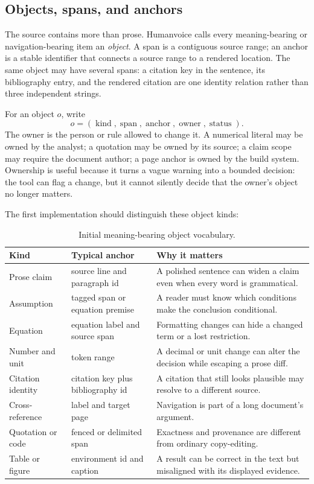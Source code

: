 \subsection{Objects, spans, and anchors}

The source contains more than prose. Humanvoice calls every meaning-bearing
or navigation-bearing item an \emph{object}. A span is a contiguous source
range; an anchor is a stable identifier that connects a source range to a
rendered location. The same object may have several spans: a citation key in
the sentence, its bibliography entry, and the rendered citation are one
identity relation rather than three independent strings.

For an object $o$, write
\[
  o=(\operatorname{kind},\operatorname{span},\operatorname{anchor},
     \operatorname{owner},\operatorname{status}).
\]
The owner is the person or rule allowed to change it. A numerical literal may
be owned by the analyst; a quotation may be owned by its source; a claim
scope may require the document author; a page anchor is owned by the build
system. Ownership is useful because it turns a vague warning into a bounded
decision: the tool can flag a change, but it cannot silently decide that the
owner's object no longer matters.

The first implementation should distinguish these object kinds:

\begin{table}[H]
\centering
\small
\begin{tabularx}{\textwidth}{@{}p{}p{}L@{}}
\toprule
Kind & Typical anchor & Why it matters \\
\midrule
Prose claim & source line and paragraph id & A polished sentence can widen a
claim even when every word is grammatical. \\
Assumption & tagged span or equation premise & A reader must know which
conditions make the conclusion conditional. \\
Equation & equation label and source span & Formatting changes can hide a
changed term or a lost restriction. \\
Number and unit & token range & A decimal or unit change can alter the
decision while escaping a prose diff. \\
Citation identity & citation key plus bibliography id & A citation that still
looks plausible may resolve to a different source. \\
Cross-reference & label and target page & Navigation is part of a long
document's argument. \\
Quotation or code & fenced or delimited span & Exactness and provenance are
different from ordinary copy-editing. \\
Table or figure & environment id and caption & A result can be correct in the
text but misaligned with its displayed evidence. \\
\bottomrule
\end{tabularx}
\caption{Initial meaning-bearing object vocabulary.}
\label{tab:object-vocabulary}
\end{table}

